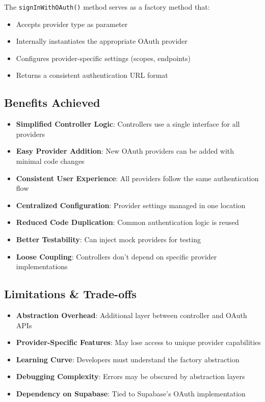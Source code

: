 \documentclass[a4paper,12pt]{report}
\begin{document}
The \texttt{signInWithOAuth()} method serves as a factory method that:
\begin{itemize}
    \item Accepts provider type as parameter
    \item Internally instantiates the appropriate OAuth provider
    \item Configures provider-specific settings (scopes, endpoints)
    \item Returns a consistent authentication URL format
\end{itemize}

\subsection{Benefits Achieved}

\begin{itemize}
    \item \textbf{Simplified Controller Logic}: Controllers use a single interface for all providers
    \item \textbf{Easy Provider Addition}: New OAuth providers can be added with minimal code changes
    \item \textbf{Consistent User Experience}: All providers follow the same authentication flow
    \item \textbf{Centralized Configuration}: Provider settings managed in one location
    \item \textbf{Reduced Code Duplication}: Common authentication logic is reused
    \item \textbf{Better Testability}: Can inject mock providers for testing
    \item \textbf{Loose Coupling}: Controllers don't depend on specific provider implementations
\end{itemize}

\subsection{Limitations \& Trade-offs}

\begin{itemize}
    \item \textbf{Abstraction Overhead}: Additional layer between controller and OAuth APIs
    \item \textbf{Provider-Specific Features}: May lose access to unique provider capabilities
    \item \textbf{Learning Curve}: Developers must understand the factory abstraction
    \item \textbf{Debugging Complexity}: Errors may be obscured by abstraction layers
    \item \textbf{Dependency on Supabase}: Tied to Supabase's OAuth implementation
\end{itemize}
\end{document}
